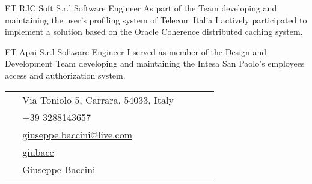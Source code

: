 \documentclass[10pt]{article} %
\begin{document}
\begin{paracol}{2}
{FT} %
{RJC Soft S.r.l} %
{Software Engineer} %
{As part of the Team developing and maintaining the user's profiling system of Telecom Italia I actively
participated to implement a solution based on the Oracle Coherence distributed caching system.} %

{FT} %
{Apai S.r.l} %
{Software Engineer} %
{I served as member of the Design and Development Team developing and maintaining the Intesa San Paolo's
employees access and authorization system.} %


\vspace{-\baselineskip}\medskip %

\switchcolumn %


\parbox[top][0.12\textheight][c]{\linewidth}{ %
	\vspace{-0.04\textheight} %
	\colorbox{shade}{ %
		\begin{supertabular}{p{0.05\linewidth}|p{0.775\linewidth}} %
			\raisebox{-1pt}{\faHome} & Via Toniolo 5, Carrara, 54033, Italy \\ %
			\raisebox{-1pt}{\faPhone} & +39 3288143657 \\ %
			\raisebox{0pt}{\small\faEnvelope} & \href{mailto:giuseppe.baccini@live.com}{giuseppe.baccini@live.com} \\ %
			\raisebox{-1pt}{\faGithub} & \href{https://github.com/giubacc}{giubacc} \\ %
			\raisebox{-1pt}{\faLinkedinSquare} & \href{https://www.linkedin.com/in/giuseppe-baccini-0288687}{Giuseppe Baccini} \\ %
		\end{supertabular}
	}
}


\end{paracol}
\end{document}
